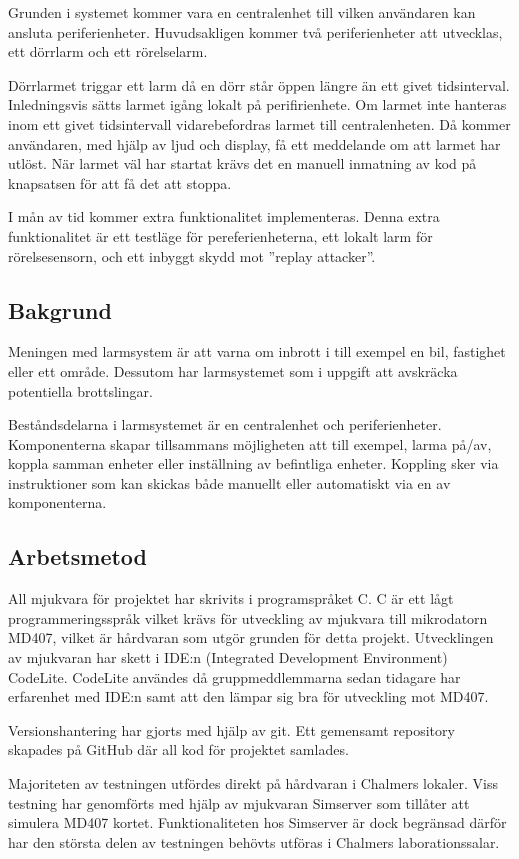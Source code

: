 \documentclass[a4paper]{article}
\begin{document}
Grunden i systemet kommer vara en centralenhet till vilken användaren kan ansluta periferienheter. Huvudsakligen kommer två periferienheter att utvecklas, ett dörrlarm och ett rörelselarm.


Dörrlarmet triggar ett larm då en dörr står öppen längre än ett givet tidsinterval. Inledningsvis sätts larmet igång lokalt på perifirienhete. Om larmet inte hanteras inom ett givet tidsintervall vidarebefordras larmet till centralenheten. Då kommer användaren, med hjälp av ljud och display, få ett meddelande om att larmet har utlöst. När larmet väl har startat krävs det en manuell inmatning av kod på knapsatsen för att få det att stoppa.

I mån av tid kommer extra funktionalitet implementeras. Denna extra funktionalitet är ett testläge för pereferienheterna, ett lokalt larm för rörelsesensorn, och ett inbyggt skydd mot ''replay attacker''.

\subsection{Bakgrund}
Meningen med larmsystem är att varna om inbrott i till exempel en bil, fastighet eller ett område. Dessutom har larmsystemet som i uppgift att avskräcka potentiella brottslingar.

Beståndsdelarna i larmsystemet är en centralenhet och periferienheter. Komponenterna skapar tillsammans möjligheten att till exempel, larma på/av, koppla samman enheter eller inställning av befintliga enheter. Koppling sker via instruktioner som kan skickas både manuellt eller automatiskt via en av komponenterna.

\subsection{Arbetsmetod}

All mjukvara för projektet har skrivits i programspråket C. C är ett lågt programmeringsspråk vilket krävs för utveckling av mjukvara till mikrodatorn MD407, vilket är hårdvaran som utgör grunden för detta projekt. Utvecklingen av mjukvaran har skett i IDE:n (Integrated Development Environment) CodeLite. CodeLite användes då gruppmeddlemmarna sedan tidagare har erfarenhet med IDE:n samt att den lämpar sig bra för utveckling mot MD407.

Versionshantering har gjorts med hjälp av git. Ett gemensamt repository skapades på GitHub där all kod för projektet samlades.

Majoriteten av testningen utfördes direkt på hårdvaran i Chalmers lokaler. Viss testning har genomförts med hjälp av mjukvaran Simserver som tillåter att simulera MD407 kortet. Funktionaliteten hos Simserver är dock begränsad därför har den största delen av testningen behövts utföras i Chalmers laborationssalar.
\end{document}
